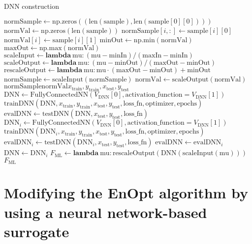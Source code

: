 
\begin{algorithm}[H]%
\caption{DNN construction}
\begin{algorithmic}[1]
\State $\mathrm{normSample} \gets \mathrm{np.zeros}((\mathrm{len}(\mathrm{sample}), \mathrm{len}(\mathrm{sample}[0][0])))$
\State $\mathrm{normVal} \gets \mathrm{np.zeros}(\mathrm{len}(\mathrm{sample}))$
\State $\mathrm{normSample}[i, :] \gets \mathrm{sample}[i][0]$
\State $\mathrm{normVal}[i] \gets \mathrm{sample}[i][1]$
\EndFor
\State $\mathrm{minOut} \gets \mathrm{np.min}(\mathrm{normVal})$
\State $\mathrm{maxOut} \gets \mathrm{np.max}(\mathrm{normVal})$
\State $\mathrm{scaleInput} \gets \mathbf{lambda}\:\mathrm{mu}: (\mathrm{mu}-\mathrm{minIn})/(\mathrm{maxIn}-\mathrm{minIn})$
\State $\mathrm{scaleOutput} \gets \mathbf{lambda}\:\mathrm{mu}: (\mathrm{mu}-\mathrm{minOut})/(\mathrm{maxOut}-\mathrm{minOut})$
\State $\mathrm{rescaleOutput} \gets \mathbf{lambda}\:\mathrm{mu}: \mathrm{mu}\cdot(\mathrm{maxOut}-\mathrm{minOut})+\mathrm{minOut}$
\State $\mathrm{normSample} \gets \mathrm{scaleInput}(\mathrm{normSample})$
\State $\mathrm{normVal} \gets \mathrm{scaleOutput}(\mathrm{normVal})$
\State {}$\mathrm{normSample}$$\mathrm{normVal}$$x_\mathrm{train}, y_\mathrm{train}, x_\mathrm{test}, y_\mathrm{test}$
\State $\mathrm{DNN} \gets \mathrm{FullyConnectedNN}(V_\mathrm{DNN}[0], \mathrm{activation\_function}=V_\mathrm{DNN}[1])$
\State $\mathrm{trainDNN}(\mathrm{DNN}, x_\mathrm{train}, y_\mathrm{train}, x_\mathrm{test}, y_\mathrm{test}, \mathrm{loss\_fn}, \mathrm{optimizer}, \mathrm{epochs})$
\State $\mathrm{evalDNN} \gets \mathrm{testDNN}(\mathrm{DNN}, x_\mathrm{test}, y_\mathrm{test}, \mathrm{loss\_fn})$
\State $\mathrm{DNN}_i \gets \mathrm{FullyConnectedNN}(V_\mathrm{DNN}[0], \mathrm{activation\_function}=V_\mathrm{DNN}[1])$
\State $\mathrm{trainDNN}(\mathrm{DNN}_i, x_\mathrm{train}, y_\mathrm{train}, x_\mathrm{test}, y_\mathrm{test}, \mathrm{loss\_fn}, \mathrm{optimizer}, \mathrm{epochs})$
\State $\mathrm{evalDNN}_i \gets \mathrm{testDNN}(\mathrm{DNN}_i, x_\mathrm{test}, y_\mathrm{test}, \mathrm{loss\_fn})$
\State $\mathrm{evalDNN} \gets \mathrm{evalDNN}_i$
\State $\mathrm{DNN} \gets \mathrm{DNN}_i$
\EndIf
\EndFor
\State $F_\mathrm{ML} \gets \mathbf{lambda}\:\mathrm{mu}: \mathrm{rescaleOutput}(\mathrm{DNN}(\mathrm{scaleInput}(\mathrm{mu})))$
\State \Return $F_\mathrm{ML}$
\EndProcedure
\end{algorithmic}
\end{algorithm}

\section{Modifying the EnOpt algorithm by using a neural network-based surrogate}
